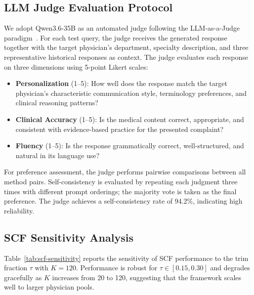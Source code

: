 \subsection*{LLM Judge Evaluation Protocol}

We adopt Qwen3.6-35B as an automated judge following the LLM-as-a-Judge paradigm~\cite{NEURIPS2023_91f18a12}. For each test query, the judge receives the generated response together with the target physician's department, specialty description, and three representative historical responses as context. The judge evaluates each response on three dimensions using 5-point Likert scales:

\begin{itemize}
\item \textbf{Personalization} (1--5): How well does the response match the target physician's characteristic communication style, terminology preferences, and clinical reasoning patterns?
\item \textbf{Clinical Accuracy} (1--5): Is the medical content correct, appropriate, and consistent with evidence-based practice for the presented complaint?
\item \textbf{Fluency} (1--5): Is the response grammatically correct, well-structured, and natural in its language use?
\end{itemize}

For preference assessment, the judge performs pairwise comparisons between all method pairs. Self-consistency is evaluated by repeating each judgment three times with different prompt orderings; the majority vote is taken as the final preference. The judge achieves a self-consistency rate of 94.2\%, indicating high reliability. 

\subsection*{SCF Sensitivity Analysis}

Table~\ref{tab:scf-sensitivity} reports the sensitivity of SCF performance to the trim fraction $\tau$ with $K=120$. Performance is robust for $\tau \in [0.15, 0.30]$ and degrades gracefully as $K$ increases from 20 to 120, suggesting that the framework scales well to larger physician pools.

